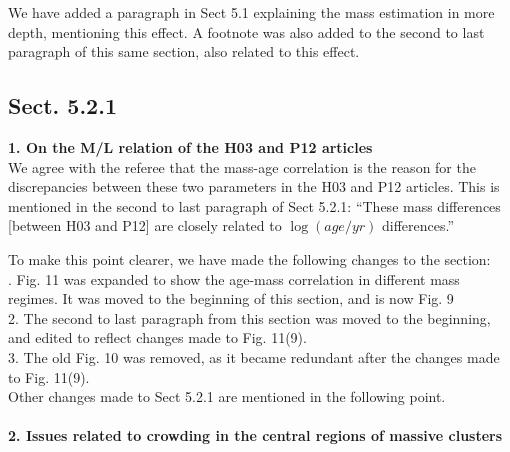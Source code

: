 \documentclass{article}
\begin{document}

We have added a paragraph in Sect 5.1 explaining the mass estimation in more
depth, mentioning this effect. A footnote was also added to the second to
last paragraph of this same section, also related to this effect.




\setcounter{subsection}{18}
\subsection{Sect. 5.2.1}
\label{sec:19}
\textbf{1. On the M/L relation of the H03 and P12 articles}\\

We agree with the referee that the mass-age correlation is the reason for the
discrepancies between these two parameters in the H03 and P12 articles. This is
mentioned in the second to last paragraph of Sect 5.2.1: ``These mass
differences [between H03 and P12] are closely related to $\log(age/yr)$
differences.''

To make this point clearer, we have made the following changes to the section:\\

. Fig. 11 was expanded to show the age-mass correlation in different
mass regimes. It was moved to the beginning of this section, and is now Fig.
9\\
2. The second to last paragraph from this section was moved to the beginning,
and edited to reflect changes made to Fig. 11(9).\\
3. The old Fig. 10 was removed, as it became redundant after the changes made
to Fig. 11(9).\\

Other changes made to Sect 5.2.1 are mentioned in the following point.\\\\

\noindent \textbf{2. Issues related to crowding in the central regions of
massive clusters}\\

\end{document}
